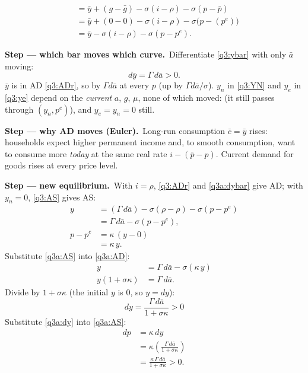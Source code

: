 \documentclass[11pt,a4paper]{article}
\newcommand{\passo}[2]{\par\smallskip\noindent\textbf{Step --- #1.}~#2}
\begin{document}
\begin{sol}
\begin{align}
&= \bar y+(g-\bar g)-\sigma(i-\rho)-\sigma(p-\bar p)\nonumber\\
&= \bar y+(0-0)-\sigma(i-\rho)-\sigma\big(p-(p^e)\big)\nonumber\\
&= \bar y-\sigma(i-\rho)-\sigma(p-p^e). \label{q3:ADr}
\end{align}
\passo{which bar moves which curve}{Differentiate \eqref{q3:ybar} with only $\bar a$ moving:}
\begin{equation}
d\bar y=\Gamma\,d\bar a>0. \label{q3a:dybar}
\end{equation}
$\bar y$ is in AD \eqref{q3:ADr}, so  by $\Gamma d\bar a$ at every
$p$ (up by $\Gamma d\bar a/\sigma$). $y_n$ in \eqref{q3:YN} and $y_e$ in \eqref{q3:ye} depend on the
\emph{current} $a$, $g$, $\mu$, none of which moved:  (it still passes
through $(y_n,p^e)$), and $y_e=y_n=0$ still.
\passo{why AD moves (Euler)}{Long-run consumption $\bar c=\bar y$ rises: households expect higher permanent
income and, to smooth consumption, want to consume more \emph{today} at the same real rate
$i-(\bar p-p)$. Current demand for goods rises at every price level.}
\passo{new equilibrium}{With $i=\rho$, \eqref{q3:ADr} and \eqref{q3a:dybar} give AD; with $y_n=0$,
\eqref{q3:AS} gives AS:}
\begin{align}
y &= (\Gamma\,d\bar a)-\sigma(\rho-\rho)-\sigma(p-p^e)\nonumber\\
&= \Gamma\,d\bar a-\sigma(p-p^e), \label{q3a:AD}\\
p-p^e &= \kappa\,(y-0)\nonumber\\
&= \kappa\,y. \label{q3a:AS}
\end{align}
Substitute \eqref{q3a:AS} into \eqref{q3a:AD}:
\begin{align*}
y &= \Gamma\,d\bar a-\sigma(\kappa\,y)\\
y(1+\sigma\kappa) &= \Gamma\,d\bar a.
\end{align*}
Divide by $1+\sigma\kappa$ (the initial $y$ is 0, so $y=dy$):
\begin{equation}
\boxed{dy=\frac{\Gamma\,d\bar a}{1+\sigma\kappa}>0} \label{q3a:dy}
\end{equation}
Substitute \eqref{q3a:dy} into \eqref{q3a:AS}:
\begin{align}
dp &= \kappa\,dy\nonumber\\
&= \kappa\left(\frac{\Gamma\,d\bar a}{1+\sigma\kappa}\right)\nonumber\\
&= \boxed{\frac{\kappa\,\Gamma\,d\bar a}{1+\sigma\kappa}>0}. \label{q3a:dp}
\end{align}

\end{sol}
\end{document}
